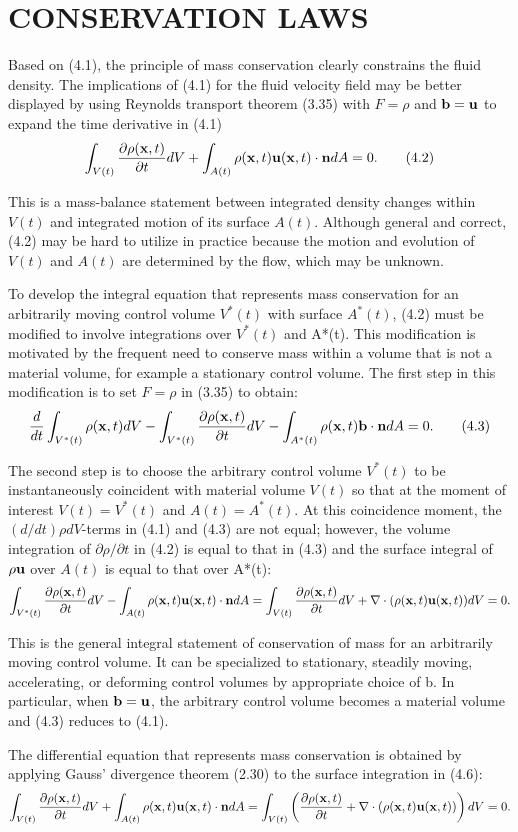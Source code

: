 \documentclass{article}
\begin{document}
\section{CONSERVATION LAWS}

Based on (4.1), the principle of mass conservation clearly constrains the fluid density. The implications of (4.1) for the fluid velocity field may be better displayed by using Reynolds transport theorem (3.35) with $F=\rho$ and ${\bf b}={\bf u}$ to expand the time derivative in (4.1)
$$
\int_{V(t)} \frac{\partial\rho(\mathbf{x}, t)}{\partial t} d V+\int_{A(t)} \rho(\mathbf{x}, t) {\bf u}(\mathbf{x}, t) \cdot {\bf n} d A = 0. \tag{4.2}
$$

This is a mass-balance statement between integrated density changes within $V(t)$ and integrated motion of its surface $A(t)$. Although general and correct, (4.2) may be hard to utilize in practice because the motion and evolution of $V(t)$ and $A(t)$ are determined by the flow, which may be unknown.

To develop the integral equation that represents mass conservation for an arbitrarily moving control volume $V^{*}(t)$ with surface $A^{*}(t)$, (4.2) must be modified to involve integrations over $V^{*}(t)$ and A*(t). This modification is motivated by the frequent need to conserve mass within a volume that is not a material volume, for example a stationary control volume. The first step in this modification is to set $F=\rho$ in (3.35) to obtain:
$$
\frac{d}{dt} \int_{V^{*}(t)} \rho(\mathbf{x}, t) d V - \int_{V^{*}(t)} \frac{\partial\rho(\mathbf{x}, t)}{\partial t} d V - \int_{A^{*}(t)} \rho(\mathbf{x}, t) {\bf b} \cdot {\bf n} d A = 0. \tag{4.3}
$$

The second step is to choose the arbitrary control volume $V^{*}(t)$ to be instantaneously coincident with material volume $V(t)$ so that at the moment of interest $V(t) = V^{*}(t)$ and $A(t) = A^{*}(t)$. At this coincidence moment, the $(d/dt)\rho d V$-terms in (4.1) and (4.3) are not equal; however, the volume integration of $\partial\rho/ \partial t$ in (4.2) is equal to that in (4.3) and the surface integral of $\rho{\bf u}$ over $A(t)$ is equal to that over A*(t):
$$
\int_{V^{*}(t)} \frac{\partial\rho(\mathbf{x}, t)}{\partial t} d V - \int_{A(t)} \rho(\mathbf{x}, t) {\bf u}(\mathbf{x}, t) \cdot {\bf n} d A = \int_{V(t)} \frac{\partial\rho(\mathbf{x}, t)}{\partial t} d V + \nabla \cdot (\rho(\mathbf{x}, t) {\bf u}(\mathbf{x}, t)) d V = 0.
$$

This is the general integral statement of conservation of mass for an arbitrarily moving control volume. It can be specialized to stationary, steadily moving, accelerating, or deforming control volumes by appropriate choice of b. In particular, when ${\bf b}={\bf u}$, the arbitrary control volume becomes a material volume and (4.3) reduces to (4.1).

The differential equation that represents mass conservation is obtained by applying Gauss' divergence theorem (2.30) to the surface integration in (4.6):
$$
\int_{V(t)} \frac{\partial\rho(\mathbf{x}, t)}{\partial t} d V + \int_{A(t)} \rho(\mathbf{x}, t) {\bf u}(\mathbf{x}, t) \cdot {\bf n} d A = \int_{V(t)} \left( \frac{\partial\rho(\mathbf{x}, t)}{\partial t} + \nabla \cdot (\rho(\mathbf{x}, t) {\bf u}(\mathbf{x}, t)) \right) d V = 0.
$$
\end{document}
